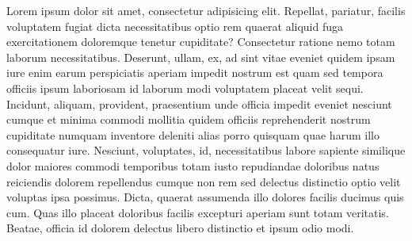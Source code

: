 \documentclass{article}
\begin{document}
\newpage


Lorem ipsum dolor sit amet, consectetur adipisicing elit. Repellat, pariatur, facilis voluptatem fugiat dicta necessitatibus optio rem quaerat aliquid fuga exercitationem doloremque tenetur cupiditate? Consectetur ratione nemo totam laborum necessitatibus.
Deserunt, ullam, ex, ad sint vitae eveniet quidem ipsam iure enim earum perspiciatis aperiam impedit nostrum est quam sed tempora officiis ipsum laboriosam id laborum modi voluptatem placeat velit sequi.
Incidunt, aliquam, provident, praesentium unde officia impedit eveniet nesciunt cumque et minima commodi mollitia quidem officiis reprehenderit nostrum cupiditate numquam inventore deleniti alias porro quisquam quae harum illo consequatur iure.
Nesciunt, voluptates, id, necessitatibus labore sapiente similique dolor maiores commodi temporibus totam iusto repudiandae doloribus natus reiciendis dolorem repellendus cumque non rem sed delectus distinctio optio velit voluptas ipsa possimus.
Dicta, quaerat assumenda illo dolores facilis ducimus quis cum. Quas illo placeat doloribus facilis excepturi aperiam sunt totam veritatis. Beatae, officia id dolorem delectus libero distinctio et ipsum odio modi.
\end{document}
